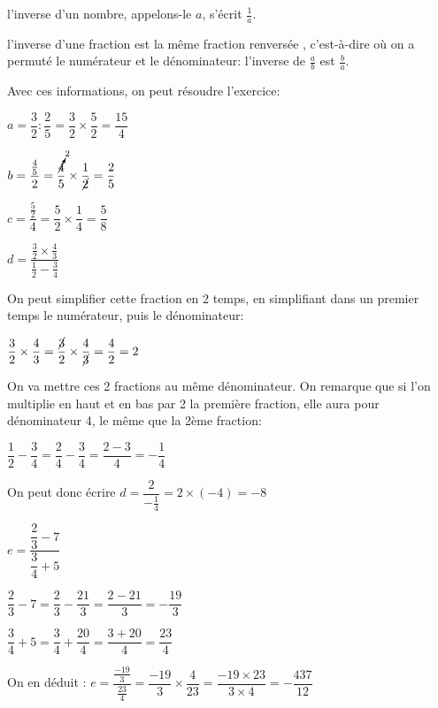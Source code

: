 \documentclass[a4paper,12pt]{scrartcl}
\begin{document}
l'inverse d'un nombre, appelons-le $a$, s'écrit $\frac{1}{a}$. 

l'inverse d'une fraction est la même fraction \og renversée \fg{}, c'est-à-dire où on a permuté le numérateur et le dénominateur: l'inverse de $\frac{a}{b}$ est $\frac{b}{a}$.

Avec ces informations, on peut résoudre l'exercice:

\question{}
$a = \dfrac{3}{2} : \dfrac{2}{5} = \dfrac{3}{2} \times \dfrac{5}{2} = \dfrac{15}{4}$

\question{}
$b = \dfrac{\frac{4}{5}}{2} = \dfrac{\cancelto{2}{4}}{5} \times \dfrac{1}{\cancel{2}} = \dfrac{2}{5}$

\question{}

$c = \dfrac{\frac{5}{2}}{4} = \dfrac{5}{2} \times \dfrac{1}{4} = \dfrac{5}{8}$

\question{}
$d = \dfrac{\frac{3}{2} \times \frac{4}{3}}{\frac{1}{2} - \frac{3}{4}}$

On peut simplifier cette fraction en 2 temps, en simplifiant dans un premier temps le numérateur, puis le dénominateur:


$\dfrac{3}{2} \times \dfrac{4}{3} = \dfrac{\cancel{3}}{2} \times \dfrac{4}{\cancel{3}} = \dfrac{4}{2} = 2$




On va mettre ces 2 fractions au même dénominateur. On remarque que si l'on multiplie en haut et en bas par 2 la première fraction, elle aura pour dénominateur 4, le même que la 2ème fraction: 

$\dfrac{1}{2} - \dfrac{3}{4} = \dfrac{2}{4} - \dfrac{3}{4} = \dfrac{2-3}{4} = -\dfrac{1}{4}$

On peut donc écrire $d = \dfrac{2}{-\frac{1}{4}} = 2 \times (-4) = -8$


\question{}
$e = \dfrac{\dfrac{2}{3} - 7}{\dfrac{3}{4} + 5}$


$\dfrac{2}{3} - 7 = \dfrac{2}{3} - \dfrac{21}{3} = \dfrac{2-21}{3} = -\dfrac{19}{3}$


$\dfrac{3}{4} + 5 = \dfrac{3}{4} + \dfrac{20}{4} = \dfrac{3+20}{4} = \dfrac{23}{4}$

On en déduit : $e = \dfrac{\frac{-19}{3}}{\frac{23}{4}} = \dfrac{-19}{3} \times \dfrac{4}{23} = \dfrac{-19 \times 23}{3 \times 4} = -\dfrac{437}{12}$
\end{document}
